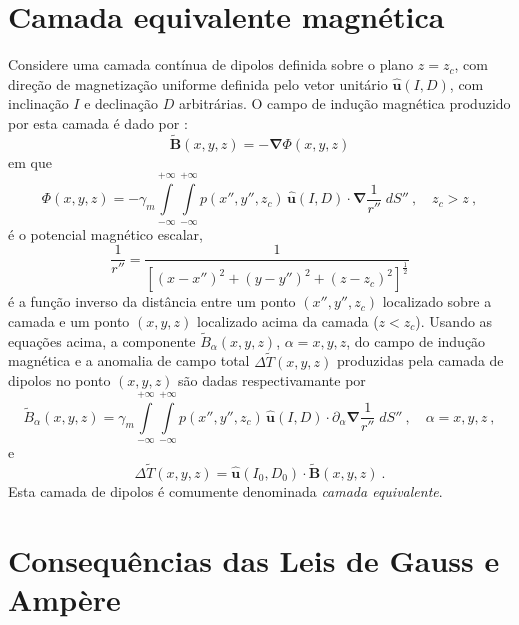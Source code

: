 \section{Camada equivalente magnética}
\label{sec:camada-equivalente}


Considere uma camada contínua de dipolos definida sobre o plano $z = z_{c}$, com 
direção de magnetização uniforme definida pelo vetor unitário $\hat{\mathbf{u}}(I, D)$,
com inclinação $I$ e declinação $D$ arbitrárias. O campo de indução magnética 
produzido por esta camada é dado por \citep[e.g., ][]{hansen_miyazaki1984}:
\begin{equation}
\tilde{\mathbf{B}}(x, y, z) = - \boldsymbol{\nabla} \Phi(x, y, z)
\label{eq:B-layer}
\end{equation}
em que
\begin{equation}
\Phi(x, y, z) = - \gamma_{m} \int\limits_{-\infty}^{+\infty}\int\limits_{-\infty}^{+\infty} 
p(x'', y'', z_{c}) \, \hat{\mathbf{u}}(I, D) \cdot \boldsymbol{\nabla} \frac{1}{r''} \; dS'' \: , \quad z_{c} > z \: ,
\label{eq:Phi-potential}
\end{equation}
é o potencial magnético escalar,
\begin{equation}
\frac{1}{r''} = \frac{1}{\left[ (x - x'')^{2} + (y - y'')^{2} + (z - z_{c})^{2} \right]^{\frac{1}{2}}}
\label{eq:inv-r''}
\end{equation}
é a função inverso da distância entre um ponto $(x'', y'', z_{c})$ localizado sobre a camada 
e um ponto $(x, y, z)$ localizado acima da camada ($z < z_{c}$).
Usando as equações acima, a componente $\tilde{B}_{\alpha}(x, y, z)$, $\alpha = x, y, z$, do campo de indução 
magnética e a anomalia de campo total $\Delta\tilde{T}(x, y, z)$ produzidas pela camada de dipolos no 
ponto $(x, y, z)$ são dadas respectivamante por
\begin{equation}
\tilde{B}_{\alpha}(x, y, z) = \gamma_{m} \int\limits_{-\infty}^{+\infty}\int\limits_{-\infty}^{+\infty} 
p(x'', y'', z_{c}) \, \hat{\mathbf{u}}(I, D) \cdot \partial_{\alpha} \boldsymbol{\nabla} \frac{1}{r''} \; dS'' 
\: , \quad \alpha = x, y, z \: ,
\label{eq:B-alpha-layer}
\end{equation}
e
\begin{equation}
\Delta\tilde{T}(x, y, z) = \hat{\mathbf{u}}(I_{0}, D_{0}) \cdot \tilde{\mathbf{B}}(x, y, z) \: .
\label{eq:Delta-T-layer}
\end{equation}
Esta camada de dipolos é comumente denominada \textit{camada equivalente}.


\section{Consequências das Leis de Gauss e Amp{\`e}re}
\label{sec:Gauss-Ampere}

